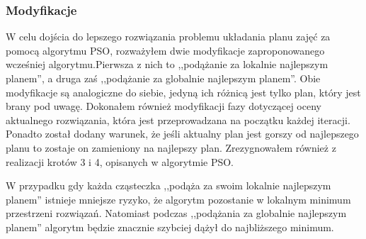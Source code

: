 \subsubsection{Modyfikacje}
\par W celu dojścia do lepszego rozwiązania problemu układania planu zajęć za pomocą algorytmu PSO, rozważyłem dwie modyfikacje zaproponowanego wcześniej algorytmu.Pierwsza z nich to  ,,podążanie za lokalnie najlepszym planem'', a druga zaś ,,podążanie za globalnie najlepszym planem''. Obie modyfikacje są analogiczne do siebie, jedyną ich różnicą jest tylko plan, który jest brany pod uwagę. Dokonałem również modyfikacji fazy dotyczącej oceny aktualnego rozwiązania, która jest przeprowadzana na początku każdej iteracji. Ponadto został dodany warunek, że jeśli aktualny plan jest gorszy od najlepszego planu to zostaje on zamieniony na najlepszy plan. Zrezygnowałem również z realizacji krotów 3 i 4, opisanych w algorytmie PSO.

\par W przypadku gdy każda cząsteczka ,,podąża za swoim lokalnie najlepszym planem'' istnieje mniejsze ryzyko, że algorytm pozostanie w lokalnym minimum przestrzeni rozwiązań. Natomiast podczas ,,podążania za globalnie najlepszym planem'' algorytm będzie znacznie szybciej dążył do najbliższego minimum.

